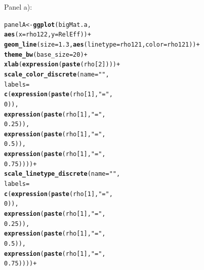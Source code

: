 \documentclass{article}\usepackage[]{graphicx}\usepackage[]{color}
\makeatletter
\newcommand{\hlnum}[1]{\textcolor[rgb]{0.686,0.059,0.569}{#1}}%
\newcommand{\hlstr}[1]{\textcolor[rgb]{0.192,0.494,0.8}{#1}}%
\newcommand{\hlopt}[1]{\textcolor[rgb]{0,0,0}{#1}}%
\newcommand{\hlstd}[1]{\textcolor[rgb]{0.345,0.345,0.345}{#1}}%
\newcommand{\hlkwb}[1]{\textcolor[rgb]{0.69,0.353,0.396}{#1}}%
\newcommand{\hlkwc}[1]{\textcolor[rgb]{0.333,0.667,0.333}{#1}}%
\newcommand{\hlkwd}[1]{\textcolor[rgb]{0.737,0.353,0.396}{\textbf{#1}}}%
\newenvironment{kframe}{%
 \def\at@end@of@kframe{}%
 \ifinner\ifhmode%
  \def\at@end@of@kframe{\end{minipage}}%
  \begin{minipage}{\columnwidth}%
 \fi\fi%
 \def\FrameCommand##1{\hskip\@totalleftmargin \hskip-\fboxsep
 \colorbox{shadecolor}{##1}\hskip-\fboxsep
     \hskip-\linewidth \hskip-\@totalleftmargin \hskip\columnwidth}%
 \MakeFramed {\advance\hsize-\width
   \@totalleftmargin\z@ \linewidth\hsize
   \@setminipage}}%
 {\par\unskip\endMakeFramed%
 \at@end@of@kframe}
\newenvironment{knitrout}{}{} %
\makeatother
\begin{document}
Panel a):
\begin{knitrout}
\color{fgcolor}\begin{kframe}
\begin{alltt}
\hlstd{panelA} \hlkwb{<-} \hlkwd{ggplot}\hlstd{(bigMat.a,}
                 \hlkwd{aes}\hlstd{(}\hlkwc{x}\hlstd{=rho122,} \hlkwc{y}\hlstd{=RelEff))} \hlopt{+}
  \hlkwd{geom_line}\hlstd{(}\hlkwc{size}\hlstd{=}\hlnum{1.3}\hlstd{,} \hlkwd{aes}\hlstd{(}\hlkwc{linetype}\hlstd{=rho121,} \hlkwc{color}\hlstd{=rho121))} \hlopt{+}
  \hlkwd{theme_bw}\hlstd{(}\hlkwc{base_size} \hlstd{=} \hlnum{20}\hlstd{)}\hlopt{+}
  \hlkwd{xlab}\hlstd{(}\hlkwd{expression}\hlstd{(}\hlkwd{paste}\hlstd{(rho[}\hlnum{2}\hlstd{])))} \hlopt{+}
  \hlkwd{scale_color_discrete}\hlstd{(}\hlkwc{name} \hlstd{=} \hlstr{""}\hlstd{,}
                       \hlkwc{labels} \hlstd{=}
                         \hlkwd{c}\hlstd{(}\hlkwd{expression}\hlstd{(}\hlkwd{paste}\hlstd{(rho[}\hlnum{1}\hlstd{],} \hlstr{"="}\hlstd{,}
                                            \hlnum{0}\hlstd{)),}
                           \hlkwd{expression}\hlstd{(}\hlkwd{paste}\hlstd{(rho[}\hlnum{1}\hlstd{],} \hlstr{"="}\hlstd{,}
                                            \hlnum{0.25}\hlstd{)),}
                           \hlkwd{expression}\hlstd{(}\hlkwd{paste}\hlstd{(rho[}\hlnum{1}\hlstd{],} \hlstr{"="}\hlstd{,}
                                            \hlnum{0.5}\hlstd{)),}
                           \hlkwd{expression}\hlstd{(}\hlkwd{paste}\hlstd{(rho[}\hlnum{1}\hlstd{],} \hlstr{"="}\hlstd{,}
                                            \hlnum{0.75}\hlstd{))))} \hlopt{+}
  \hlkwd{scale_linetype_discrete}\hlstd{(}\hlkwc{name} \hlstd{=} \hlstr{""}\hlstd{,}
                          \hlkwc{labels} \hlstd{=}
                            \hlkwd{c}\hlstd{(}\hlkwd{expression}\hlstd{(}\hlkwd{paste}\hlstd{(rho[}\hlnum{1}\hlstd{],} \hlstr{"="}\hlstd{,}
                                               \hlnum{0}\hlstd{)),}
                              \hlkwd{expression}\hlstd{(}\hlkwd{paste}\hlstd{(rho[}\hlnum{1}\hlstd{],} \hlstr{"="}\hlstd{,}
                                               \hlnum{0.25}\hlstd{)),}
                              \hlkwd{expression}\hlstd{(}\hlkwd{paste}\hlstd{(rho[}\hlnum{1}\hlstd{],} \hlstr{"="}\hlstd{,}
                                               \hlnum{0.5}\hlstd{)),}
                              \hlkwd{expression}\hlstd{(}\hlkwd{paste}\hlstd{(rho[}\hlnum{1}\hlstd{],} \hlstr{"="}\hlstd{,}
                                               \hlnum{0.75}\hlstd{))))} \hlopt{+}

\end{alltt}
\end{kframe}
\end{knitrout}
\end{document}
